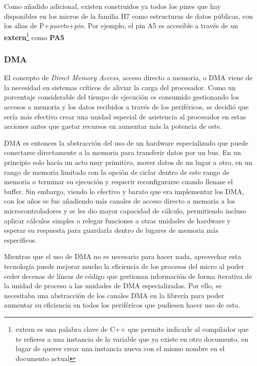 \documentclass{report}
\begin{document}
Como añadido adicional, existen construidos ya todos los pines que hay disponibles en los micros de la familia H7 como estructuras de datos públicas, con los alias de P+\textit{puerto}+\textit{pin}. Por ejemplo, el pin A5 es accesible a través de un \textbf{extern}\footnote{extern es una palabra clave de C++ que permite indicarle al compilador que te refieres a una instancia de la variable que ya existe en otro documento, en lugar de querer crear una instancia nueva con el mismo nombre en el documento actual} como \textbf{PA5} 

\subsubsection{DMA}
El concepto de \textit{Direct Memory Access}, acceso directo a memoria, o DMA viene de la necesidad en sistemas críticos de aliviar la carga del procesador. Como un porcentaje considerable del tiempo de ejecución es consumido gestionando los accesos a memoria y los datos recibidos a través de los periféricos, se decidió que sería más efectivo crear una unidad especial de asistencia al procesador en estas acciones antes que gastar recursos en aumentar más la potencia de este. 
\par \vspace{0.3 cm}
DMA es entonces la abstracción del uso de un hardware especializado que puede conectarse directamente a la memoria para transferir datos por un bus. En un principio solo hacía un acto muy primitivo, mover datos de un lugar a otro, en un rango de memoria limitado con la opción de ciclar dentro de este rango de memoria o terminar su ejecución y requerir reconfigurarse cuando llenase el buffer. Sin embargo, viendo lo efectivo y barato que era implementar los DMA, con los años se fue añadiendo más canales de acceso directo a memoria a los microcontroladores y se les dio mayor capacidad de cálculo, permitiendo incluso aplicar cálculos simples o relegar funciones a otras unidades de hardware y esperar su respuesta para guardarla dentro de lugares de memoria más específicos. 
\par \vspace{0.3 cm}
Mientras que el uso de DMA no es necesario para hacer nada, aprovechar esta tecnología puede mejorar mucho la eficiencia de los procesos del micro al poder ceder decenas de líneas de código que gestionan información de forma iterativa de la unidad de proceso a las unidades de DMA especializadas. Por ello, se necesitaba una abstracción de los canales DMA en la librería para poder aumentar su eficiencia en todos los periféricos que pudiesen hacer uso de esta. \par \vspace{0.3 cm}
\end{document}
